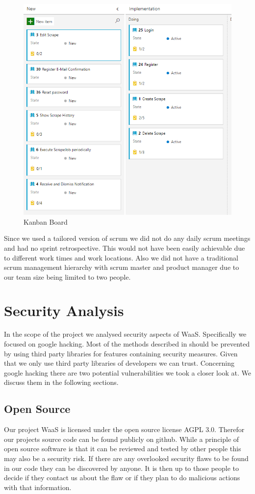 \documentclass[titlepage, 12pt]{article}
\begin{document}
\begin{figure}[H]
  \centering
  \includegraphics[width=0.65\linewidth]{KanbanBoard.png}
  \caption{Kanban Board}
  \label{fig:kanbanBoard}
\end{figure}

Since we used a tailored version of scrum we did not do any daily scrum meetings and had no sprint retrospective. This would not have been easily achievable due to different work times and work locations. Also we did not have a traditional scrum management hierarchy with scrum master and product manager due to our team size being limited to two people.

\section{Security Analysis}

In the scope of the project we analysed security aspects of WaaS. Specifically we focused on google hacking. Most of the methods described in \cite{mJohnnyLong2005} should be prevented by using third party libraries for features containing security measures. Given that we only use third party libraries of developers we can trust. Concerning google hacking there are two potential vulnerabilities we took a closer look at. We discuss them in the following sections.

\subsection{Open Source}
\label{sec:opensource}

Our project WaaS is licensed under the open source license AGPL 3.0. Therefor our projects source code can be found publicly on github. While a principle of open source software is that it can be reviewed and tested by other people this may also be a security risk. If there are any overlooked security flaws to be found in our code they can be discovered by anyone. It is then up to those people to decide if they contact us about the flaw or if they plan to do malicious actions with that information.
\end{document}
